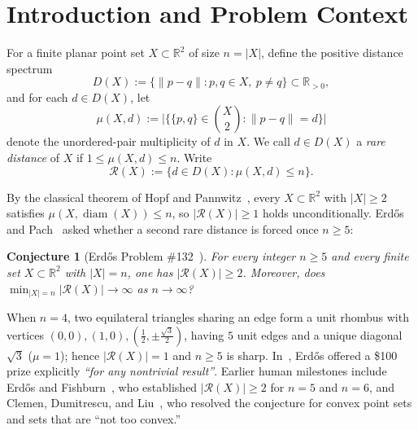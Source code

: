 \documentclass[11pt,reqno]{amsart}
\newtheorem{conjecture}[theorem]{Conjecture}
\theoremstyle{definition}
\newcommand{\R}{\mathbb{R}}
\newcommand{\card}[1]{|#1|}
\begin{document}
\begin{abstract}
\begin{enumerate}
\end{enumerate}
\end{abstract}

\maketitle

\section{Introduction and Problem Context}

For a finite planar point set $X \subset \R^2$ of size $n = \card{X}$, define the positive distance spectrum
\[
D(X) := \{ \|p - q\| : p, q \in X,\ p \neq q \} \subset \R_{>0},
\]
and for each $d \in D(X)$, let
\[
\mu(X, d) := \bigl|\bigl\{ \{p, q\} \in \binom{X}{2} : \|p - q\| = d \bigr\}\bigr|
\]
denote the unordered-pair multiplicity of $d$ in $X$. We call $d \in D(X)$ a \emph{rare distance} of $X$ if $1 \le \mu(X, d) \le n$. Write
\[
\mathcal{R}(X) := \{ d \in D(X) : \mu(X, d) \le n \}.
\]

By the classical theorem of Hopf and Pannwitz~\cite{HoPa34}, every $X \subset \R^2$ with $\card{X} \ge 2$ satisfies $\mu(X, \operatorname{diam}(X)) \le n$, so $\card{\mathcal{R}(X)} \ge 1$ holds unconditionally. Erd\H{o}s and Pach~\cite{Er84c,ErPa90,ErFi95,Er97b,Er97e} asked whether a second rare distance is forced once $n \ge 5$:

\begin{conjecture}[Erd\H{o}s Problem \#132~\cite{Er84c,ErFi95,Er97e}]\label{conj:e132}
For every integer $n \ge 5$ and every finite set $X \subset \R^2$ with $\card{X} = n$, one has $\card{\mathcal{R}(X)} \ge 2$. Moreover, does $\min_{\card{X}=n} \card{\mathcal{R}(X)} \to \infty$ as $n \to \infty$?
\end{conjecture}

When $n = 4$, two equilateral triangles sharing an edge form a unit rhombus with vertices $(0,0), (1,0), (\tfrac{1}{2}, \pm \tfrac{\sqrt{3}}{2})$, having $5$ unit edges and a unique diagonal $\sqrt{3}$ ($\mu = 1$); hence $\card{\mathcal{R}(X)} = 1$ and $n \ge 5$ is sharp. In~\cite{Er97e}, Erd\H{o}s offered a \$100 prize explicitly \emph{``for any nontrivial result''}. Earlier human milestones include Erd\H{o}s and Fishburn~\cite{ErFi95}, who established $\card{\mathcal{R}(X)} \ge 2$ for $n = 5$ and $n = 6$, and Clemen, Dumitrescu, and Liu~\cite{CDL25}, who resolved the conjecture for convex point sets and sets that are ``not too convex.''
\end{document}
